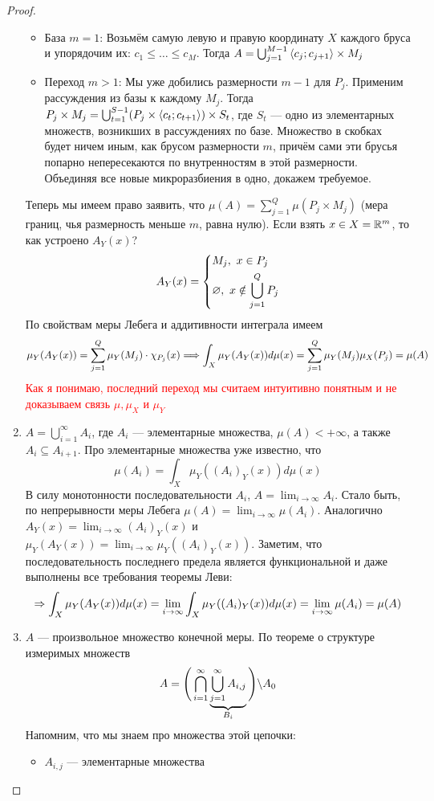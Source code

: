 \begin{proof}
\begin{enumerate}
		\begin{itemize}
			\item База $m = 1$: Возьмём самую левую и правую координату $X$ каждого бруса и упорядочим их: $c_1 \le \ldots \le c_M$. Тогда $A = \bigcup_{j = 1}^{M - 1} \left\langle c_j; c_{j + 1}\right\rangle \times M_j$
			
			\item Переход $m > 1$: Мы уже добились размерности $m - 1$ для $P_j$. Применим рассуждения из базы к каждому $M_j$. Тогда $P_j \times M_j = \bigcup_{t = 1}^{S - 1} (P_j \times \left\langle c_t; c_{t + 1}\right\rangle) \times S_t$, где $S_t$ --- одно из элементарных множеств, возникших в рассуждениях по базе. Множество в скобках будет ничем иным, как брусом размерности $m$, причём сами эти брусья попарно непересекаются по внутренностям в этой размерности. Объединяя все новые микроразбиения в одно, докажем требуемое.
		\end{itemize}
		Теперь мы имеем право заявить, что $\mu(A) = \sum_{j = 1}^Q \mu(P_j \times M_j)$ (мера границ, чья размерность меньше $m$, равна нулю). Если взять $x \in X = \mathbb{R}^m$, то как устроено $A_Y(x)$?
		\[
			A_Y(x) = \left\{\begin{aligned}
				&{M_j,\ x \in P_j}
				\\
				&{\varnothing,\ x \notin \bigcup_{j = 1}^Q P_j}
			\end{aligned}\right.
		\]
		По свойствам меры Лебега и аддитивности интеграла имеем
		\[
			\mu_Y(A_Y(x)) = \sum_{j = 1}^Q \mu_Y(M_j) \cdot \chi_{P_j}(x) \Longrightarrow \int_X \mu_Y(A_Y(x)) d\mu(x) = \sum_{j = 1}^Q \mu_Y(M_j) \mu_X(P_j) = \mu(A)
		\]
		\textcolor{red}{Как я понимаю, последний переход мы считаем интуитивно понятным и не доказываем связь $\mu, \mu_X$ и $\mu_Y$}
		
		\item $A = \bigcup_{i = 1}^\infty A_i$, где $A_i$ --- элементарные множества, $\mu(A) < +\infty$, а также $A_i \subseteq A_{i + 1}$. Про элементарные множества уже известно, что
		\[
			\mu(A_i) = \int_X \mu_Y((A_i)_Y(x))d\mu(x)
		\]
		В силу монотонности последовательности $A_i$, $A = \lim_{i \to \infty} A_i$. Стало быть, по непрерывности меры Лебега $\mu(A) = \lim_{i \to \infty} \mu(A_i)$. Аналогично $A_Y(x) = \lim_{i \to \infty} (A_i)_Y(x)$ и $\mu_Y(A_Y(x)) = \lim_{i \to \infty} \mu_Y((A_i)_Y(x))$. Заметим, что последовательность последнего предела является функциональной и даже выполнены все требования теоремы Леви:
		\[
			\Rightarrow \int_X \mu_Y(A_Y(x))d\mu(x) = \lim_{i \to \infty} \int_X \mu_Y((A_i)_Y(x))d\mu(x) = \lim_{i \to \infty} \mu(A_i) = \mu(A)
		\]
		
		\item $A$ --- произвольное множество конечной меры. По теореме о структуре измеримых множеств
		\[
			A = \Bigg(\bigcap_{i = 1}^\infty \underbrace{\bigcup_{j = 1}^\infty A_{i, j}}_{B_i}\Bigg) \backslash A_0
		\]
		Напомним, что мы знаем про множества этой цепочки:
		\begin{itemize}
			\item $A_{i, j}$ --- элементарные множества
			

\end{itemize}
\end{enumerate}
\end{proof}
